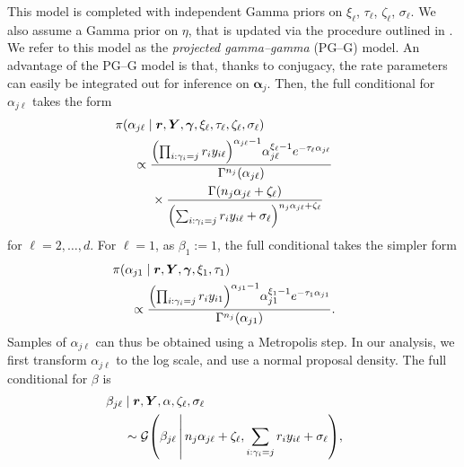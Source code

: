 This model is completed with independent Gamma priors on $\xi_{\ell}$, $\tau_{\ell}$, $\zeta_{\ell}$, $\sigma_{\ell}$.  
We also assume a Gamma prior on $\eta$, that is updated via the procedure outlined in \cite{escobar1995}.  
We refer to this model as the \emph{projected gamma--gamma} (PG--G) model.  An advantage of the PG--G model 
is that, thanks to conjugacy, the rate parameters can easily be integrated out for inference on $\bm{\alpha}_j$.  
Then, the full conditional for $\alpha_{j\ell}$ takes the form
\begin{equation}
    \label{eqn:alphalupdate}
    \begin{aligned}
    &\hspace{-0.5cm}\pi(\alpha_{j\ell}\mid \bm{r},\bm{Y},\bm{\gamma},\xi_\ell,\tau_\ell,\zeta_\ell,\sigma_\ell) \\
    &\propto \frac{\left(\prod_{i:\gamma_i = j}r_iy_{i\ell}\right)^{\alpha_{j\ell} - 1}\alpha_{j\ell}^{\xi_\ell - 1}e^{-\tau_\ell \alpha_{j\ell}}}{\Gamma^{n_j}(\alpha_{j\ell})} \\
    &\hspace{0.5cm}\times \frac{\Gamma\left(n_j\alpha_{j\ell} + \zeta_{\ell}\right)}{\left(\sum_{i:\gamma_i = j}r_iy_{i\ell} + \sigma_{\ell}\right)^{n_j\alpha_{j\ell} + \zeta_{\ell}}}
    \end{aligned}
\end{equation}
for $\ell = 2,\ldots,d$.  For $\ell = 1$, as $\beta_{1} := 1$, the full conditional takes the simpler form
\begin{equation}
    \label{eqn:alpha1update}
    \begin{aligned}
    &\hspace{-0.5cm}\pi(\alpha_{j1}\mid\bm{r},\bm{Y},\bm{\gamma},\xi_1,\tau_1) \\
    &\propto \frac{\left(\prod_{i:\gamma_i = j}r_iy_{i1}\right)^{\alpha_{j1} - 1}\alpha_{j1}^{\xi_1 - 1}e^{-\tau_1\alpha_{j1}}}{\Gamma^{n_j}(\alpha_{j1})}.
    \end{aligned}
\end{equation}
Samples of $\alpha_{j\ell}$ can thus be obtained using a Metropolis step. In our analysis, we first transform $\alpha_{j\ell}$ to the log scale, and use a normal proposal density.
The full conditional for $\beta$ is 
\begin{equation}
    \label{eqn:betafc}
    \begin{aligned}
    &\hspace{-0.5cm}\beta_{j\ell}\mid\bm{r},\bm{Y},\alpha,\zeta_{\ell},\sigma_{\ell} \\
    &\sim \mathcal{G}\left(\beta_{j\ell}\bigmid n_j\alpha_{j\ell} + \zeta_\ell, \sum_{i:\gamma_i = j}r_iy_{i\ell} + \sigma_{\ell}\right),
    \end{aligned}
\end{equation}

